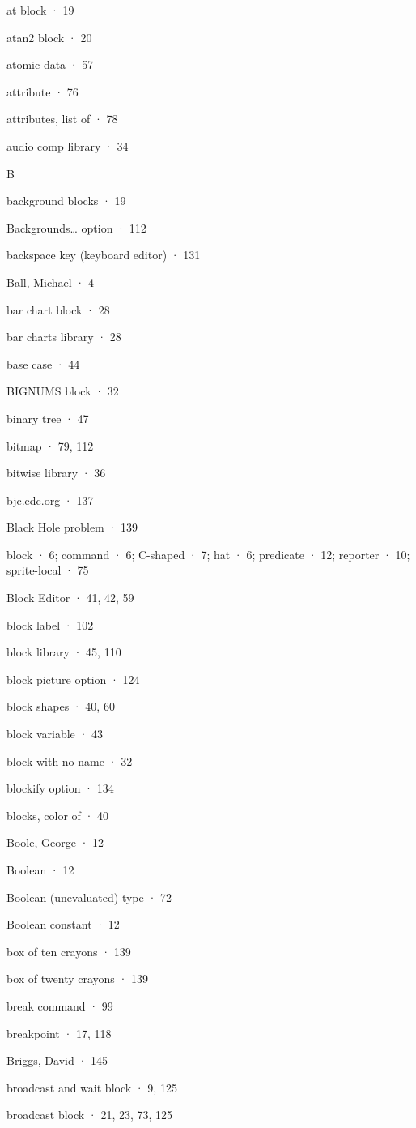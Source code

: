 \documentclass[
  letterpaper,
]{book}
\begin{document}
at block · 19

atan2 block · 20

atomic data · 57

attribute · 76

attributes, list of · 78

audio comp library · 34

B

background blocks · 19

Backgrounds\ldots{} option · 112

backspace key (keyboard editor) · 131

Ball, Michael · 4

bar chart block · 28

bar charts library · 28

base case · 44

BIGNUMS block · 32

binary tree · 47

bitmap · 79, 112

bitwise library · 36

bjc.edc.org · 137

Black Hole problem · 139

block · 6; command · 6; C-shaped · 7; hat · 6; predicate · 12; reporter
· 10; sprite-local · 75

Block Editor · 41, 42, 59

block label · 102

block library · 45, 110

block picture option · 124

block shapes · 40, 60

block variable · 43

block with no name · 32

blockify option · 134

blocks, color of · 40

Boole, George · 12

Boolean · 12

Boolean (unevaluated) type · 72

Boolean constant · 12

box of ten crayons · 139

box of twenty crayons · 139

break command · 99

breakpoint · 17, 118

Briggs, David · 145

broadcast and wait block · 9, 125

broadcast block · 21, 23, 73, 125
\end{document}
